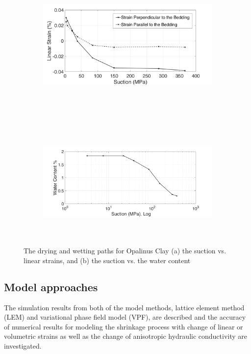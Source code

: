 \begin{figure}[!ht]
\begin{subfigure}[b]{1\textwidth}
\centering
\includegraphics[width=11cm,height=6cm]{figures/Amir_ME6_Strain.png}
\subcaption{}
\label{fig:Amir_ME6_Strain}
\end{subfigure}
\\
\begin{subfigure}[b]{1\textwidth}
\centering
\includegraphics[width=11cm,height=6cm]{figures/Amir_ME6_Water.png}
\subcaption{}
\label{fig:Amir_ME6_Water}
\end{subfigure}
\caption{The drying and wetting paths for Opalinus Clay (a) the suction vs. linear strains, and (b) the suction vs. the water content}
\end{figure}

\subsection{Model approaches}
The simulation results from both of the model methods, lattice element method (LEM) and variational phase field model (VPF), are described and the accuracy of numerical results for modeling the shrinkage process with change of linear or volumetric strains as well as the change of anisotropic hydraulic conductivity are investigated. 
